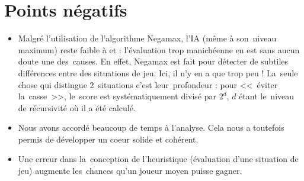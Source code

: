 \section{Points négatifs}
\begin{itemize}

	\item Malgré l'utilisation de l'algorithme Negamax, l'IA (même à son~niveau maximum) reste faible à \ttt{} et \cf{} : 
            l'évaluation trop manichéenne en est sans aucun doute une des~causes. En effet, Negamax est fait pour 
            détecter de subtiles différences entre des situations de jeu. Ici, il n'y en a que trop peu ! 
            La~seule chose qui distingue 2~situations c'est leur~profondeur : pour <<~éviter la~casse~>>, 
            le~score est systématiquement divisé par $2^d$, $d$ étant le~niveau de récursivité où il a été calculé. 
            
    \item Nous avons accordé beaucoup de temps à l'analyse. 
            Cela nous a toutefois permis de développer un coeur solide et cohérent.
    
    \item Une erreur dans la~conception de l'heuristique (évaluation d'une situation de jeu) 
            augmente les~chances qu'un joueur moyen puisse gagner.
    
\end{itemize}